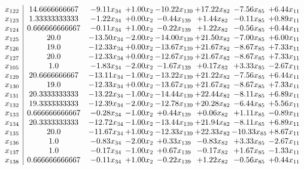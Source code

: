 \documentclass[8pt]{article}
\begin{document}
\[\begin{array}{c| c c@{\hskip 2pt} c@{\hskip 2pt} c@{\hskip 2pt} c@{\hskip 2pt} c@{\hskip 2pt} c@{\hskip 2pt} }
 x_{122}   &  14.6666666667 & -9.11 x_{34} & +  1.00 x_{2} & -10.22 x_{139} & + 17.22 x_{82} & -7.56 x_{85} & +  6.44 x_{11}\\
 x_{123}   &  1.33333333333 & -1.22 x_{34} & +  0.00 x_{2} & -0.44 x_{139} & +  1.44 x_{82} & -0.11 x_{85} & +  0.89 x_{11}\\
 x_{124}   &  0.666666666667 & -0.11 x_{34} & +  1.00 x_{2} & -0.22 x_{139} & +  1.22 x_{82} & -0.56 x_{85} & +  0.44 x_{11}\\
 x_{125}   &  20.0 & -13.50 x_{34} & -2.00 x_{2} & -14.00 x_{139} & + 21.50 x_{82} & -7.00 x_{85} & +  6.00 x_{11}\\
 x_{126}   &  19.0 & -12.33 x_{34} & +  0.00 x_{2} & -13.67 x_{139} & + 21.67 x_{82} & -8.67 x_{85} & +  7.33 x_{11}\\
 x_{127}   &  20.0 & -12.33 x_{34} & +  0.00 x_{2} & -12.67 x_{139} & + 21.67 x_{82} & -8.67 x_{85} & +  7.33 x_{11}\\
 x_{105}   &  1.0 & -1.83 x_{34} & -2.00 x_{2} & -1.67 x_{139} & +  0.17 x_{82} & +  3.33 x_{85} & -2.67 x_{11}\\
 x_{129}   &  20.6666666667 & -13.11 x_{34} & -1.00 x_{2} & -13.22 x_{139} & + 21.22 x_{82} & -7.56 x_{85} & +  6.44 x_{11}\\
 x_{130}   &  19.0 & -12.33 x_{34} & +  0.00 x_{2} & -13.67 x_{139} & + 21.67 x_{82} & -8.67 x_{85} & +  7.33 x_{11}\\
 x_{131}   &  20.3333333333 & -13.22 x_{34} & -1.00 x_{2} & -14.44 x_{139} & + 22.44 x_{82} & -8.11 x_{85} & +  6.89 x_{11}\\
 x_{132}   &  19.3333333333 & -12.39 x_{34} & -2.00 x_{2} & -12.78 x_{139} & + 20.28 x_{82} & -6.44 x_{85} & +  5.56 x_{11}\\
 x_{133}   &  0.666666666667 & -0.28 x_{34} & -1.00 x_{2} & +  0.44 x_{139} & +  0.06 x_{82} & +  1.11 x_{85} & -0.89 x_{11}\\
 x_{134}   &  20.3333333333 & -12.72 x_{34} & -1.00 x_{2} & -13.44 x_{139} & + 21.94 x_{82} & -8.11 x_{85} & +  6.89 x_{11}\\
 x_{135}   &  20.0 & -11.67 x_{34} & +  1.00 x_{2} & -12.33 x_{139} & + 22.33 x_{82} & -10.33 x_{85} & +  8.67 x_{11}\\
 x_{136}   &  1.0 & -0.83 x_{34} & -2.00 x_{2} & +  0.33 x_{139} & -0.83 x_{82} & +  3.33 x_{85} & -2.67 x_{11}\\
 x_{137}   &  1.0 & -0.17 x_{34} & -1.00 x_{2} & +  0.67 x_{139} & -0.17 x_{82} & +  1.67 x_{85} & -1.33 x_{11}\\
 x_{138}   &  0.666666666667 & -0.11 x_{34} & +  1.00 x_{2} & -0.22 x_{139} & +  1.22 x_{82} & -0.56 x_{85} & +  0.44 x_{11}\\

\end{array}\]
\end{document}
